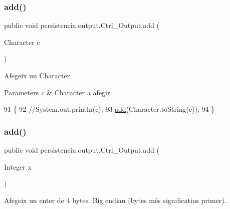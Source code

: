 \subsubsection{\texorpdfstring{add()}{add()}\hspace{0.1cm}{\footnotesize\ttfamily [3/6]}}
{\footnotesize\ttfamily public void persistencia.\+output.\+Ctrl\+\_\+\+Output.\+add (\begin{DoxyParamCaption}\item[{Character}]{c }\end{DoxyParamCaption})\hspace{0.3cm}{\ttfamily [inline]}}



Afegeix un Character. 


\begin{DoxyParams}{Parameters}
{\em c} & Character a afegir \\
\hline
\end{DoxyParams}

\begin{DoxyCode}
91                                  \{
92         \textcolor{comment}{//System.out.println(c);}
93         \hyperlink{classpersistencia_1_1output_1_1Ctrl__Output_a8c5aa5a6acb5259faeb1c05c71ddd21c}{add}(Character.toString(c));
94     \}
\end{DoxyCode}
\mbox{\label{classpersistencia_1_1output_1_1Ctrl__Output_aefe249b0ae9dbe578c44d96c6b56cf5d}} 
\subsubsection{\texorpdfstring{add()}{add()}\hspace{0.1cm}{\footnotesize\ttfamily [4/6]}}
{\footnotesize\ttfamily public void persistencia.\+output.\+Ctrl\+\_\+\+Output.\+add (\begin{DoxyParamCaption}\item[{Integer}]{x }\end{DoxyParamCaption})\hspace{0.3cm}{\ttfamily [inline]}}



Afegeix un enter de 4 bytes. Big endian (bytes més significatius primer). 


